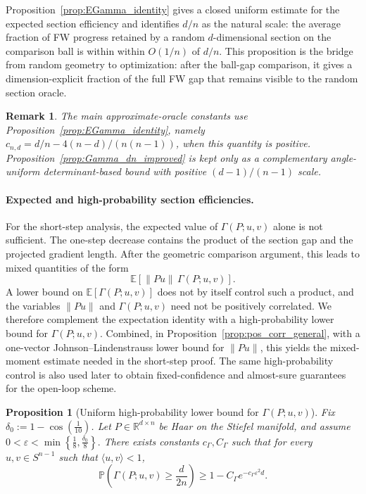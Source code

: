 \documentclass{article}
\newtheorem{proposition}{Proposition}
\newtheorem{remark}{Remark}
\begin{document}
Proposition~\ref{prop:EGamma_identity} gives a closed uniform estimate for the
expected section efficiency and identifies \(d/n\) as the natural scale:
the average fraction of FW progress retained by a random \(d\)-dimensional section
on the comparison ball is within 
within \(O(1/n)\) of \(d/n\). This proposition is the bridge from random geometry to optimization: after the
ball-gap comparison, it gives a dimension-explicit fraction of the full FW gap
that remains visible to the random section oracle.
\begin{remark}
The main approximate-oracle constants use Proposition~\ref{prop:EGamma_identity},
namely \(c_{n,d}=d/n-4(n-d)/(n(n-1))\), when this quantity is positive.
Proposition~\ref{prop:Gamma_dn_improved} is kept only as a complementary
angle-uniform determinant-based bound with positive \((d-1)/(n-1)\) scale.
\end{remark}

\paragraph{Expected and high-probability section efficiencies.}
For the short-step analysis, the expected value of
\(\Gamma(P;u,v)\) alone is not sufficient. The one-step decrease contains the product of the section gap and the projected gradient length. After the geometric comparison argument, this leads to mixed quantities of the form
\[
    \mathbb E\!\left[\|Pu\|\,\Gamma(P;u,v)\right].
\]
A lower bound on \(\mathbb E[\Gamma(P;u,v)]\) does not by itself
control such a product, and the variables \(\|Pu\|\) and \(\Gamma(P;u,v)\) need not be positively correlated. We therefore complement the expectation identity with a high-probability lower bound for \(\Gamma(P;u,v)\). Combined, in Proposition~\ref{prop:pos_corr_general}, with a one-vector Johnson--Lindenstrauss lower bound  for \(\|Pu\|\), this yields the mixed-moment estimate needed in the short-step proof. The same
high-probability control is also used later to obtain fixed-confidence and
almost-sure guarantees for the open-loop scheme.
\begin{proposition}[Uniform high-probability lower bound for $\Gamma(P;u,v)$]
\label{prop:GammaHP}
Fix $\delta_0:=1-\cos(\tfrac{1}{10})$.
Let $P\in\mathbb R^{d\times n}$ be Haar on the Stiefel manifold, and assume $0<\varepsilon<\min\!\left\{\frac18,\frac{\delta_0}{8}\right\}.$ There exists constants \(c_\Gamma,C_\Gamma\) such that for every $u,v\in S^{n-1}$ such that $\langle u,v \rangle <1$,
\begin{equation}
\mathbb P\!\left(
\Gamma(P;u,v)\ge \frac{d}{2n}
\right)
\ge
1-C_{\Gamma}e^{-c_{\Gamma}\varepsilon^2d}.
\label{eq:Gammahp_unif}
\end{equation}
\end{proposition}
\end{document}
